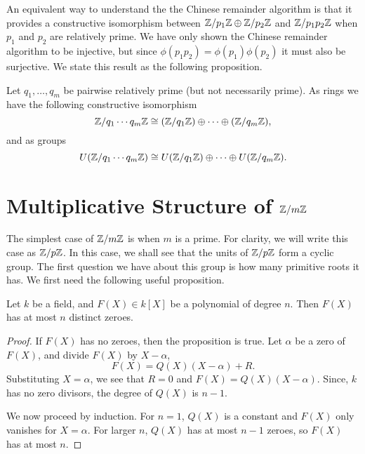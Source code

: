 An equivalent way to understand the the Chinese remainder algorithm is
that it provides a constructive isomorphism between $\mathbb{Z}/p_1\mathbb{Z} \oplus
\mathbb{Z}/p_2\mathbb{Z}$ and $\mathbb{Z}/p_1p_2\mathbb{Z}$ when $p_1$ and $p_2$ are relatively prime.
We have only shown the Chinese remainder algorithm to be injective,
but since $\phi(p_1 p_2) = \phi(p_1) \phi(p_2)$ it must also be
surjective.  We state this result as the following proposition.

\begin{proposition} \label{FF:UnitDecomp:Prop}
Let $q_1, \ldots, q_m$ be pairwise relatively prime (but not necessarily
prime).  As rings we have the following constructive isomorphism
\[
\mathbb{Z}/q_1 \cdots q_m \mathbb{Z} \cong (\mathbb{Z}/q_1\mathbb{Z}) \oplus \cdots \oplus (\mathbb{Z}/q_m\mathbb{Z}),
\]
and as groups
\[
U(\mathbb{Z}/q_1 \cdots q_m \mathbb{Z}) \cong U(\mathbb{Z}/q_1\mathbb{Z}) \oplus \cdots \oplus U(\mathbb{Z}/q_m\mathbb{Z}).
\]
\end{proposition}


\section{Multiplicative Structure of \texorpdfstring{${\mathbb{Z}}/{m}\mathbb{Z}$}{Z/mZ}}
\label{FF:Multiplicative:Sec}

The simplest case of $\mathbb{Z}/m\mathbb{Z}$ is when $m$ is a prime.  For clarity, we
will write this case as $\mathbb{Z}/p\mathbb{Z}$.  In this case, we shall see that the
units of $\mathbb{Z}/p\mathbb{Z}$ form a cyclic group.  The first question we have
about this group is how many primitive roots it
has.  We first need the following useful proposition.

\begin{proposition}\label{FFZeroBound:Prop}
Let $k$ be a field, and $F(X) \in k[X]$ be a polynomial of degree $n$.
Then $F(X)$ has at most $n$ distinct zeroes.
\end{proposition}

\begin{proof}
If $F(X)$ has no zeroes, then the proposition is true.  Let $\alpha$
be a zero of $F(X)$, and divide $F(X)$ by $X-\alpha$,
\[
F(X) = Q(X) (X - \alpha) + R.
\]
Substituting $X = \alpha$, we see that $R = 0$ and $F(X) = Q(X) (X -
\alpha)$.  Since, $k$ has no zero divisors, the degree of $Q(X)$ is
$n- 1$.

We now proceed by induction.  For $n = 1$, $Q(X)$ is a constant and
$F(X)$ only vanishes for $X = \alpha$.  For larger $n$, $Q(X)$ has at
most $n-1$ zeroes, so $F(X)$ has at most $n$.
\end{proof}

